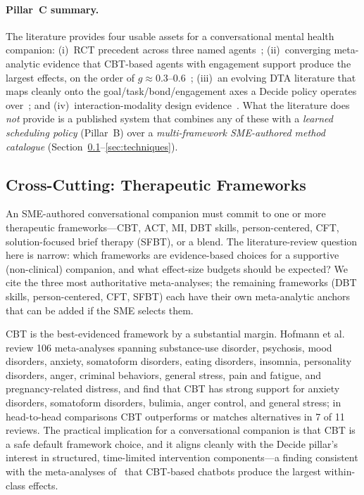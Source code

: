 \documentclass[11pt,a4paper]{article}
\newcommand{\secref}[1]{Section~\ref{#1}}
\begin{document}
\paragraph{Pillar~C summary.}
The literature provides four usable assets for a conversational
mental health companion: (i)~RCT precedent across three named
agents~\cite{Fitzpatrick2017Woebot,Inkster2018Wysa,Heinz2025TherabotRCT};
(ii)~converging meta-analytic evidence that CBT-based agents with
engagement support produce the largest effects, on the order of
$g\!\approx\!0.3\text{--}0.6$~\cite{Linardon2019Meta,He2023CASRMeta,Li2023AICAMeta};
(iii)~an evolving DTA literature that maps cleanly onto the
goal/task/bond/engagement axes a Decide policy operates
over~\cite{Henson2019DTA,Lederman2021DTASpecialIssue,MalouinLachance2025DTAReview};
and (iv)~interaction-modality design
evidence~\cite{Mai2022CoachbotInteraction}. What the literature
does \emph{not} provide is a published system that combines any of
these with a \emph{learned scheduling policy} (Pillar~B) over a
\emph{multi-framework SME-authored method catalogue}
(\secref{sec:frameworks}--\ref{sec:techniques}).

\subsection{Cross-Cutting: Therapeutic Frameworks}\label{sec:frameworks}

An SME-authored conversational companion must commit to one or
more therapeutic frameworks---CBT, ACT, MI, DBT skills,
person-centered, CFT, solution-focused brief therapy (SFBT), or a
blend. The literature-review question here is narrow: which
frameworks are evidence-based choices for a supportive
(non-clinical) companion, and what effect-size budgets should be
expected? We cite the three most authoritative meta-analyses; the
remaining frameworks (DBT skills, person-centered, CFT, SFBT) each
have their own meta-analytic anchors that can be added if the SME
selects them.

CBT is the best-evidenced framework by a substantial margin.
Hofmann et al.~\cite{Hofmann2012CBTMeta} review 106 meta-analyses
spanning substance-use disorder, psychosis, mood disorders,
anxiety, somatoform disorders, eating disorders, insomnia,
personality disorders, anger, criminal behaviors, general stress,
pain and fatigue, and pregnancy-related distress, and find that
CBT has strong support for anxiety disorders, somatoform
disorders, bulimia, anger control, and general stress; in
head-to-head comparisons CBT outperforms or matches alternatives
in 7 of 11 reviews. The practical implication for a conversational
companion is that CBT is a safe default framework choice, and it
aligns cleanly with the Decide pillar's interest in structured,
time-limited intervention components---a finding consistent with
the meta-analyses
of~\cite{Linardon2019Meta,He2023CASRMeta,Li2023AICAMeta} that
CBT-based chatbots produce the largest within-class effects.
\end{document}

